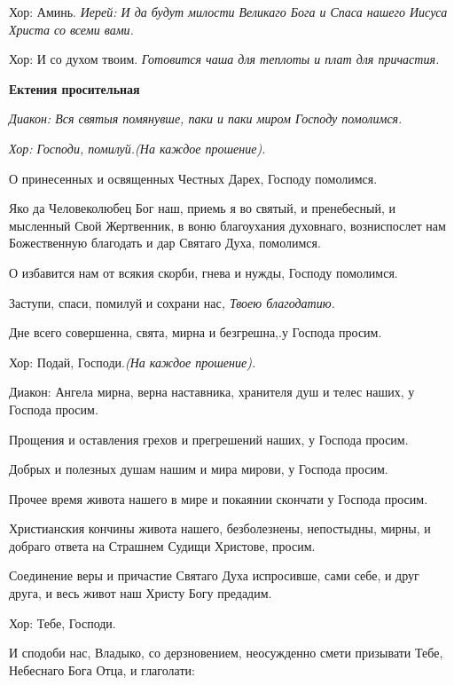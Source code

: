  


  Хор:\normalfont{} Аминь. \itshape  Иерей:\normalfont{} И да будут милости Великаго Бога и Спаса нашего Иисуса Христа со всеми вами. \itshape 


  Хор:\normalfont{} И со духом твоим. \itshape  Готовится чаша для теплоты и плат для причастия\normalfont{}. 


\medskip


 \bfseries  Ектения просительная \normalfont{} 


\itshape  Диакон:\normalfont{} Вся святыя помянувше, паки и паки миром Господу помолимся. 


\itshape Хор:\normalfont{} Господи, помилуй.\itshape  (На каждое прошение)\normalfont{}. 


  О принесенных и освященных Честных Дарех, Господу помолимся. 


  Яко да Человеколюбец Бог наш, приемь я во святый, и пренебесный, и мысленный Свой Жертвенник, в воню благоухания духовнаго, возниспослет нам Божественную благодать и дар Святаго Духа, помолимся. 


  О избавится нам от всякия скорби, гнева и нужды, Господу помолимся. 


  Заступи, спаси, помилуй и сохрани нас\itshape ,\normalfont{} Твоею благодатию. 


  Дне всего совершенна, свята, мирна и безгрешна,.у Господа просим. \itshape 


  Хор:\normalfont{} Подай, Господи.\itshape  (На каждое прошение)\normalfont{}. \itshape 


  Диакон:\normalfont{} Ангела мирна, верна наставника, хранителя душ и телес наших, у Господа просим. 


  Прощения и оставления грехов и прегрешений наших, у Господа просим. 


  Добрых и полезных душам нашим и мира мирови, у Господа просим. 


  Прочее время живота нашего в мире и покаянии скончати у Господа просим. 


  Христианския кончины живота нашего, безболезнены, непостыдны, мирны, и добраго ответа на Страшнем Судищи Христове, просим. 


  Соединение веры и причастие Святаго Духа испросивше, сами себе, и друг друга, и весь живот наш Христу Богу предадим. \itshape 


  Хор:\normalfont{} Тебе, Господи. 


  И сподоби нас, Владыко, со дерзновением, неосужденно смети призывати Тебе, Небеснаго Бога Отца, и глаголати: 


